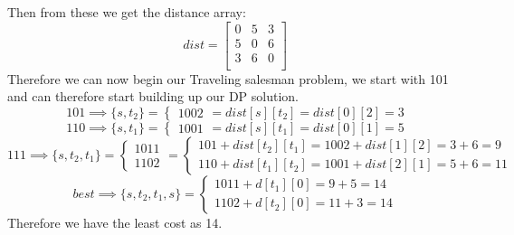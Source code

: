 \documentclass[12pt]{article}
\begin{document}
Then from these we get the distance array:
\[
dist =
\begin{bmatrix}
0 & 5 & 3 \\
5 & 0 & 6 \\
3 & 6 & 0 \\
\end{bmatrix}
\]
Therefore we can now begin our Traveling salesman problem, we start with 101 and can therefore
start building up our DP solution.
\[
101 \implies \{s,t_2\} =
\begin{cases}
1002
\end{cases}
= dist[s][t_2] = dist[0][2] = 3
\]
\[
110 \implies \{s,t_1\} =
\begin{cases}
1001
\end{cases}
= dist[s][t_1] = dist[0][1] = 5
\]
\[
111 \implies \{s,t_2,t_1\} =
\begin{cases}
1011 \\
1102
\end{cases}
=
\begin{cases}
101 + dist[t_2][t_1] = 1002 + dist[1][2] = 3 + 6 = 9 \\
110 + dist[t_1][t_2] = 1001 + dist[2][1] = 5 + 6 = 11
\end{cases}
\]
\[
best \implies \{s,t_2,t_1,s\} =
\begin{cases}
1011 + d[t_1][0] = 9  + 5 = 14\\
1102 + d[t_2][0] = 11 + 3 = 14
\end{cases}
\]
Therefore we have the least cost as 14.

\newpage



\end{document}
